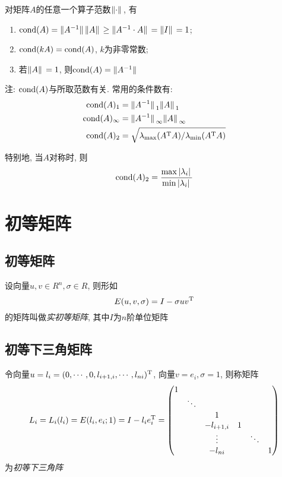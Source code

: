 对矩阵$A$的任意一个算子范数$\norm*{\cdot}$, 有
\begin{enumerate}
    \item $\text{cond}(A)=\norm*{A^{-1}}\norm*{A}\ge\norm*{A^{-1}\cdot A}=\norm*{I}=1$;
    \item $\text{cond}(kA)=\text{cond}(A)$, $k$为非零常数;
    \item 若$\norm*{A}=1$, 则$\text{cond}(A)=\norm*{A^{-1}}$
\end{enumerate}

注: $\text{cond}(A)$与所取范数有关. 常用的条件数有:
\begin{align*}
    \text{cond}(A)_1&=\norm*{A^{-1}}_1\norm*{A}_1\\
    \text{cond}(A)_\infty&=\norm*{A^{-1}}_\infty\norm*{A}_\infty\\
    \text{cond}(A)_2&=\sqrt{\lambda_\text{max}(A^\text{T}A)/\lambda_\text{min}(A^\text{T}A)}
\end{align*}

特别地, 当$A$对称时, 则
\begin{equation*}
    \text{cond}(A)_2=\frac{\max\abs*{\lambda_i}}{\min\abs*{\lambda_i}}
\end{equation*}

\section{初等矩阵}

\subsection{初等矩阵}

\begin{definition}
    设向量$u,v\in R^n, \sigma\in R$, 则形如
    \begin{equation*}
        E(u,v,\sigma)=I-\sigma uv^\text{T}
    \end{equation*}
    的矩阵叫做\emph{实初等矩阵}, 其中$I$为$n$阶单位矩阵
\end{definition}

\subsection{初等下三角矩阵}

\begin{definition}
    令向量$u=l_i=(0,\cdots,0,l_{i+1,i},\cdots,l_{ni})^\text{T}$, 向量$v=e_i, \sigma=1$, 则称矩阵
    \begin{equation*}
        L_i=L_i(l_i)=E(l_i,e_i;1)=I-l_i\transpose{e_i}=\mqty(
            1&&&&&\\
            &\ddots&&&&\\
            &&1&&&\\
            &&-l_{i+1,i}&1&&\\
            &&\vdots&&\ddots&\\
            &&-l_{ni}&&&1
        )
    \end{equation*}
    为\emph{初等下三角阵}
\end{definition}

